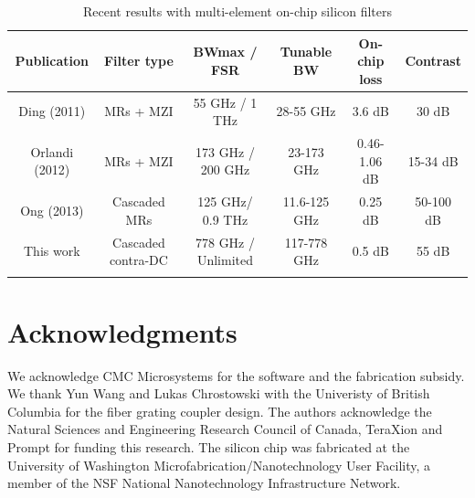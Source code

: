 \documentclass[osajnl,twocolumn,showpacs,superscriptaddress,10pt]{revtex4-1}
\begin{document}
\begin{table}[t]
\caption{Recent results with multi-element on-chip silicon filters}
\begin{tabular}{cccccc}
    \hline
	Publication & Filter type & BWmax / FSR & Tunable BW & On-chip loss & Contrast \\
    \hline
    Ding (2011) &	MRs + MZI &	55 GHz / 1 THz &	28-55 GHz &	3.6 dB &	30 dB
     \\
 	Orlandi (2012) &	MRs + MZI &	173 GHz / 200 GHz &	23-173 GHz &	0.46-1.06 dB &	15-34 dB
      \\
    Ong (2013)\cite{ong2013ultra} &	Cascaded MRs &	125 GHz/ 0.9 THz &	11.6-125 GHz &	0.25 dB &	50-100 dB
      \\
    This work & Cascaded contra-DC &	778 GHz / Unlimited  &	117-778 GHz &	0.5 dB &	55 dB \\
    
    \hline
    \label{table:comparison}
   \end{tabular}
    \end{table}





\section*{Acknowledgments}
We acknowledge CMC Microsystems for the  software and the fabrication subsidy. We thank Yun Wang and Lukas Chrostowski with the Univeristy of British Columbia for the fiber grating coupler design. The authors acknowledge the Natural Sciences and Engineering Research Council of Canada, TeraXion and Prompt for funding this research. The silicon chip was fabricated at the University of Washington Microfabrication/Nanotechnology User Facility, a member of the NSF National Nanotechnology Infrastructure Network.



\end{document}
